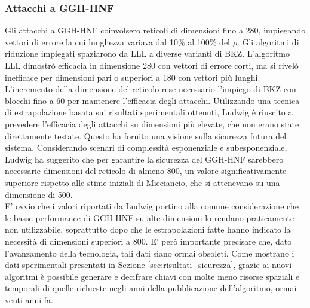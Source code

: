 \subsubsection{Attacchi a GGH-HNF}
Gli attacchi a GGH-HNF coinvolsero reticoli di dimensioni fino a 280, impiegando vettori di errore 
la cui lunghezza variava dal 10\% al 100\% del $\rho$. Gli algoritmi di riduzione impiegati spaziarono da
LLL a diverse varianti di BKZ. L'algoritmo LLL dimostrò efficacia in dimensione 280 con vettori di errore corti,
ma si rivelò inefficace per dimensioni pari o superiori a 180 con vettori più lunghi. 
L'incremento della dimensione del reticolo rese necessario l'impiego di BKZ con blocchi fino a 60 per
mantenere l'efficacia degli attacchi. Utilizzando una tecnica di estrapolazione basata sui risultati sperimentali
ottenuti, 
Ludwig è riuscito a prevedere l'efficacia degli attacchi su dimensioni più elevate, 
che non erano state direttamente testate. Questo ha fornito una visione sulla sicurezza futura del 
sistema. Considerando scenari di complessità esponenziale e subesponenziale, Ludwig ha suggerito 
che per garantire la sicurezza del GGH-HNF sarebbero necessarie dimensioni del reticolo di almeno 800, 
un valore significativamente superiore rispetto alle stime iniziali di Micciancio, 
che si attenevano su una dimensione di 500.\\

E' ovvio che i valori riportati da Ludwig portino alla comune considerazione che le basse performance
di GGH-HNF su alte dimensioni lo rendano praticamente non utilizzabile, soprattutto dopo che 
le estrapolazioni fatte hanno indicato la necessità di dimensioni superiori a 800. E' 
però importante precisare che, dato l'avanzamento della tecnologia, tali dati siano ormai obsoleti.
Come mostrano i dati sperimentali presentati in Sezione \ref{sec:risultati_sicurezza}, grazie ai nuovi
algoritmi è possibile generare e decifrare chiavi con molte meno risorse spaziali e
temporali di quelle richieste negli anni della pubblicazione dell'algoritmo, ormai venti anni fa. 
